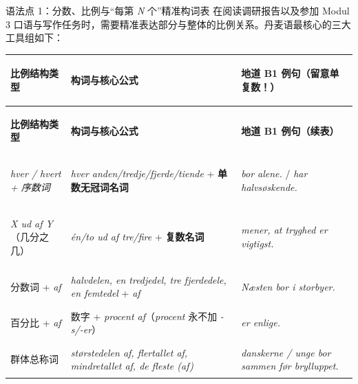 
\begin{grammatikbox}{语法点 1：分数、比例与“每第 \textit{N} 个”精准构词表}
在阅读调研报告以及参加 Modul 3 口语与写作任务时，需要精准表达部分与整体的比例关系。丹麦语最核心的三大工具组如下：
\end{grammatikbox}

\vspace{0.25em}
\renewcommand{\arraystretch}{1.24}
{\small
\begin{xltabular}{\linewidth}{@{} >{\bfseries\color{NCDNavy}\raggedright\arraybackslash}p{3.4cm} >{\raggedright\arraybackslash}p{4.3cm} >{\raggedright\arraybackslash}X @{}}
\toprule
\textbf{比例结构类型} & \textbf{构词与核心公式} & \textbf{地道 B1 例句（留意单复数！）} \\
\midrule
\endfirsthead
\toprule
\textbf{比例结构类型} & \textbf{构词与核心公式} & \textbf{地道 B1 例句（续表）} \\
\midrule
\endhead
\bottomrule
\endfoot
\textit{hver / hvert + 序数词} & \textit{hver anden/tredje/fjerde/tiende} + \textbf{单数无冠词名词} & \textit{ bor alene.} / \textit{ har halvsøskende.} \\
\textit{X ud af Y}（几分之几） & \textit{én/to ud af tre/fire} + \textbf{复数名词} & \textit{ mener, at tryghed er vigtigst.} \\
分数词 + \textit{af} & \textit{halvdelen, en tredjedel, tre fjerdedele, en femtedel} + \textit{af} & \textit{Næsten  bor i storbyer.} \\
百分比 + \textit{af} & 数字 + \textit{procent af}（\textit{procent} 永不加 \textit{-s/-er}） & \textit{ er enlige.} \\
群体总称词 & \textit{størstedelen af, flertallet af, mindretallet af, de fleste (af)} & \textit{ danskerne /  unge bor sammen før brylluppet.} \\
\end{xltabular}
}

